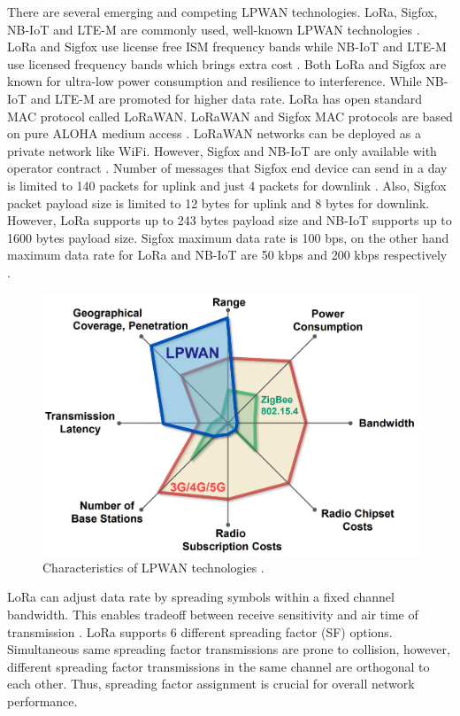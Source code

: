 There are several emerging and competing LPWAN technologies. LoRa, Sigfox, NB-IoT and LTE-M are commonly used, well-known LPWAN technologies \cite{7815384}. LoRa and Sigfox use license free ISM frequency bands while NB-IoT and LTE-M use licensed frequency bands which brings extra cost \cite{7815384}. Both LoRa and Sigfox are known for ultra-low power consumption and resilience to interference. While NB-IoT and LTE-M are promoted for higher data rate. LoRa has open standard MAC protocol called LoRaWAN. LoRaWAN and Sigfox MAC protocols are based on pure ALOHA medium access \cite{Abramson:1970:ASA:1478462.1478502}. LoRaWAN networks can be deployed as a private network like WiFi. However, Sigfox and NB-IoT are only available with operator contract \cite{7815384}. Number of messages that Sigfox end device can send in a day is limited to 140 packets for uplink and just 4 packets for downlink \cite{sigfox}. Also, Sigfox packet payload size is limited to 12 bytes for uplink and 8 bytes for downlink. However, LoRa supports up to 243 bytes payload size and NB-IoT supports up to 1600 bytes payload size. Sigfox maximum data rate is 100 bps, on the other hand maximum data rate for LoRa and NB-IoT are 50 kbps and 200 kbps respectively \cite{7815384}.

\begin{figure}[h]
\centering
\includegraphics[width=0.8\linewidth]{fig/lpwan_features.png}
\vspace*{5mm}
\caption{Characteristics of LPWAN technologies \cite{peteregli_lpwan}.}
\label{fig:lpwan_features}
\end{figure}

LoRa can adjust data rate by spreading symbols within a fixed channel bandwidth. This enables tradeoff between receive sensitivity and air time of transmission \cite{7803607}. LoRa supports 6 different spreading factor (SF) options. Simultaneous same spreading factor transmissions are prone to collision, however, different spreading factor transmissions in the same channel are orthogonal to each other. Thus, spreading factor assignment is crucial for overall network performance.

